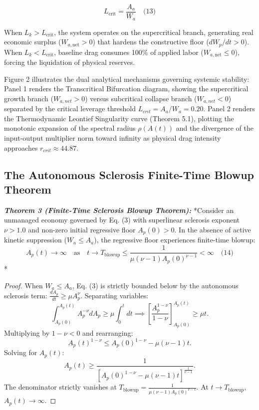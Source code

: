 \documentclass[preprint,12pt,authoryear]{elsarticle}
\theoremstyle{definition}
\begin{document}
$$L_{ \text{crit}} = \frac{A_a}{W_a} \quad \text{(13)}$$

When $L_k > L_{ \text{crit}}$, the system operates on the supercritical branch, generating real economic surplus ($W_{a, \text{net}} > 0$) that hardens the constructive floor ($dW_p/dt > 0$). When $L_k < L_{ \text{crit}}$, baseline drag consumes 100\% of applied labor ($W_{a, \text{net}} \le 0$), forcing the liquidation of physical reserves.

Figure 2 illustrates the dual analytical mechanisms governing systemic stability: Panel 1 renders the Transcritical Bifurcation diagram, showing the supercritical growth branch ($W_{a,net} > 0$) versus subcritical collapse branch ($W_{a,net} < 0$) separated by the critical leverage threshold $L_{crit} = A_a / W_a = 0.20$. Panel 2 renders the Thermodynamic Leontief Singularity curve (Theorem 5.1), plotting the monotonic expansion of the spectral radius $\rho(A(t))$ and the divergence of the input-output multiplier norm toward infinity as physical drag intensity approaches $r_{crit} \approx 44.87$.

\subsection{The Autonomous Sclerosis Finite-Time Blowup Theorem}

\textbf{\textit{Theorem 3 (Finite-Time Sclerosis Blowup Theorem):}} *Consider an unmanaged economy governed by Eq. (3) with superlinear sclerosis exponent $\nu > 1.0$ and non-zero initial regressive floor $A_p(0) > 0$. In the absence of active kinetic suppression ($W_a \le A_a$), the regressive floor experiences finite-time blowup: $$A_p(t) \to \infty \quad \text{as} \quad t \to T_{\text{blowup}} \le \frac{1}{\mu (\nu - 1) A_p(0)^{\nu - 1}} < \infty \quad \text{(14)}$$*

\begin{proof} When $W_a \le A_a$, Eq. (3) is strictly bounded below by the autonomous sclerosis term: $ \frac{dA_p}{dt} \ge \mu A_p^\nu$. Separating variables: $$\int_{A_p(0)}^{A_p(t)} A_p^{-\nu} dA_p \ge \mu \int_0^t dt \implies \left[ \frac{A_p^{1-\nu}}{1-\nu} \right]_{A_p(0)}^{A_p(t)} \ge \mu t.$$ Multiplying by $1-\nu < 0$ and rearranging: $$A_p(t)^{1-\nu} \le A_p(0)^{1-\nu} - \mu(\nu - 1)t.$$ Solving for $A_p(t)$: $$A_p(t) \ge \frac{1}{\left[ A_p(0)^{1-\nu} - \mu(\nu - 1)t \right]^{ \frac{1}{\nu - 1}}}.$$ The denominator strictly vanishes at $T_{ \text{blowup}} = \frac{1}{\mu (\nu - 1) A_p(0)^{\nu - 1}}$. At $t \to T_{\text{blowup}}$, $A_p(t) \to \infty$. \end{proof}
\end{document}
